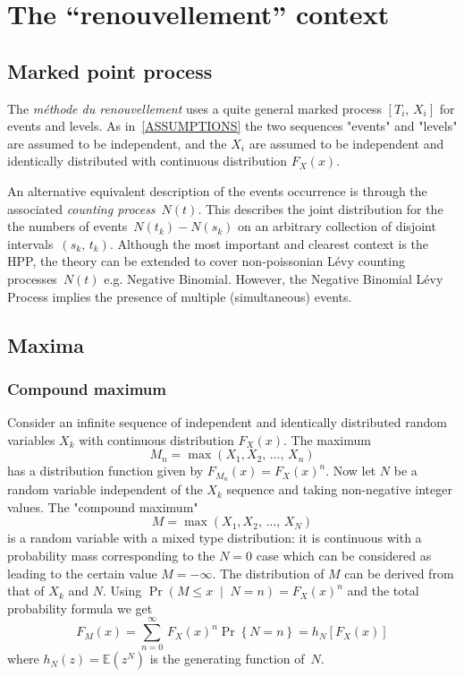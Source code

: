 \documentclass[a4paper]{report}
\newcommand{\Esp}{\mathbb{E}}
\newcommand{\pCond}[2]{\left( #1 \;\middle\vert\; #2 \right)}
\begin{document}
\chapter{The ``renouvellement'' context}

\label{ANN-Renouv}

\section{Marked point process}

The \textit{m\'ethode du renouvellement} uses a quite general marked
process $[T_i,\,X_i]$ for events and levels. As in~\ref{ASSUMPTIONS}
the two sequences "events" and "levels" are assumed to be independent,
and the $X_i$ are assumed to be independent and identically
distributed with continuous distribution $F_X(x)$.

An alternative equivalent description of the events occurrence is
through the associated \textit{counting process}~$N(t)$. This
describes the joint distribution for the the numbers of
events~$N(t_k)-N(s_{k})$ on an arbitrary collection of disjoint
intervals~$(s_k,\,t_k)$.  Although the most important and clearest
context is the HPP, the theory can be extended to cover non-poissonian
L\'evy counting processes~$N(t)$ e.g.  Negative Binomial. However, the
Negative Binomial L\'evy Process  implies the
presence of multiple (simultaneous) events.

\section{Maxima}
\label{COMPOUND}

\subsection{Compound maximum}

Consider an infinite sequence of independent and identically
distributed random variables $X_k$ with continuous distribution
$F_X(x)$. The maximum
$$
    M_n = \max(X_1, X_2, \,\dots,\, X_n)
$$
has a distribution function given by $F_{M_n}(x) = F_X(x)^n$.
Now let $N$ be a random variable independent of the $X_k$ sequence and taking 
non-negative integer values. The "compound maximum" 
$$
     M = \max(X_1, X_2, \,\dots,\, X_N)
$$
is a random variable with a mixed type distribution: it is continuous
with a probability mass corresponding to the $N=0$ case which can be
considered as leading to the certain value $M=-\infty$.  The
distribution of $M$ can be derived from that of $X_k$ and $N$. Using
$\Pr\pCond{M \leqslant x}{N=n} = F_X(x)^n$ and the total probability
formula we get
\begin{equation}
   F_M(x) =  \sum_{n=0}^\infty \,F_X(x)^n \Pr\left\{N = n\right\} 
          = h_N[F_X(x)]
\end{equation}
where $h_N(z) = \Esp\left(z^N\right)$ is the generating function
of~$N$. 
\end{document}

